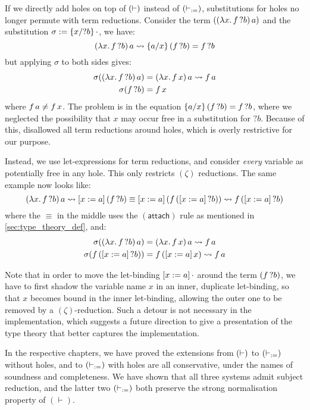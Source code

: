 \documentclass[twoside]{report}
\begin{document}
\begin{example}
If we directly add holes on top of $(\vdasho)$ instead of $(\vdashd)$, substitutions for holes no longer permute with term reductions. Consider the term $(\app {(\lam x {\app f {?b}})} a)$ and the substitution $\sigma \defeq \subst {?b} {x} {\cdot}$, we have:
$$
\app {(\lam x {\app f {?b}})} a \rightsquigarrow \subst x a {(\app f {?b})} = \app f {?b}
$$
but applying $\sigma$ to both sides gives:
$$
\begin{aligned}
\sigma(\app {(\lam x {\app f {?b}})} a) &= \app {(\lam x {\app f x})} a \rightsquigarrow \app f a \\
\sigma(\app f {?b}) &= \app f x \\
\end{aligned}
$$
where $\app f a \neq \app f x$. The problem is in the equation $\subst x a {(\app f {?b})} = \app f {?b}$, where we neglected the possibility that $x$ may occur free in a substitution for ${?b}$. Because of this, \cite{mcbride2000dependently} disallowed all term reductions around holes, which is overly restrictive for our purpose.

Instead, we use let-expressions for term reductions, and consider \emph{every} variable as potentially free in any hole. This only restricts $(\zeta)$ reductions. The same example now looks like:
$$
\app {(\lam x {\app f {?b}})} a \rightsquigarrow \llet x a {(\app f {?b})} \equiv \llet x a {(\app f {(\llet x a {?b})})} \rightsquigarrow \app f {(\llet x a {?b})}
$$
where the $\equiv$ in the middle uses the $(\mathsf{attach})$ rule as mentioned in \cref{sec:type_theory_def}, and:
$$
\begin{aligned}
\sigma(\app {(\lam x {\app f {?b}})} a) &= \app {(\lam x {\app f x})} a \rightsquigarrow \app f a \\
\sigma(\app f {(\llet x a {?b})}) &= \app f {(\llet x a x)} \rightsquigarrow \app f a \\
\end{aligned}
$$
\end{example}
Note that in order to move the let-binding $\llet x a {\cdot}$ around the term $(\app f {?b})$, we have to first shadow the variable name $x$ in an inner, duplicate let-binding, so that $x$ becomes bound in the inner let-binding, allowing the outer one to be removed by a $(\zeta)$-reduction. Such a detour is not necessary in the implementation, which suggests a future direction to give a presentation of the type theory that better captures the implementation.

In the respective chapters, we have proved the extensions from $(\vdasho)$ to $(\vdashd)$ without holes, and to $(\vdashd)$ with holes are all conservative, under the names of soundness and completeness. We have shown that all three systems admit subject reduction, and the latter two $(\vdashd)$ both preserve the strong normalisation property of $(\vdash)$.
\end{document}
